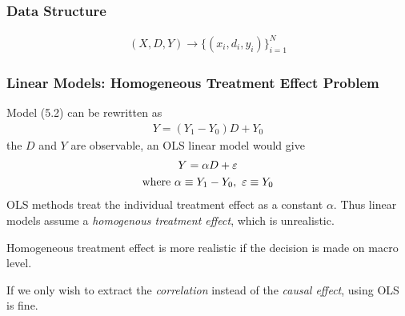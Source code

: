 \documentclass[11pt]{article}
\begin{document}
				\subsubsection{Data Structure}
					\begin{gather}
						(X, D, Y) \rightarrow \{(x_i, d_i, y_i)\}_{i=1}^N
					\end{gather}
				
				\subsubsection{Linear Models: Homogeneous Treatment Effect Problem}
					\par Model (5.2) can be rewritten as 
					\begin{gather}
						Y = (Y_1 - Y_0)D + Y_0
					\end{gather}
					the $D$ and $Y$ are observable, an OLS linear model would give
					\begin{gather}
						Y = \alpha D + \varepsilon \\
						\text{{where }}\alpha \equiv Y_1 - Y_0,\ \varepsilon \equiv Y_0
					\end{gather}
					OLS methods treat the individual treatment effect as a constant $\alpha$. Thus linear models assume a \emph{homogenous treatment effect}, which is unrealistic.
					\begin{remark}
						Homogeneous treatment effect is more realistic if the decision is made on macro level.
					\end{remark}
					
					\begin{remark}
						If we only wish to extract the \emph{correlation} instead of the \emph{causal effect}, using OLS is fine.
					\end{remark}
				
\end{document}
